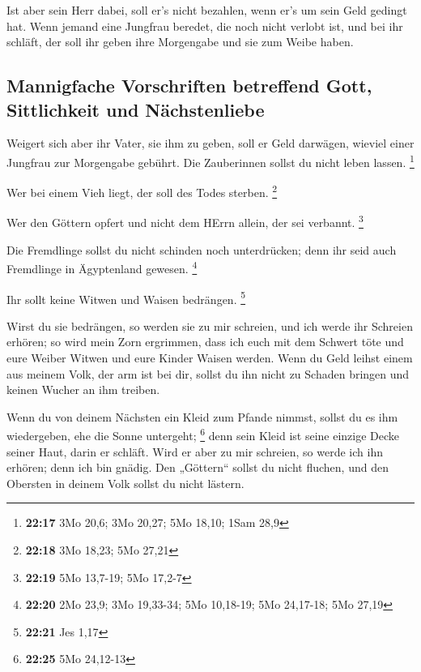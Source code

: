  Ist aber sein Herr dabei, soll er's nicht bezahlen, wenn
er's um sein Geld gedingt hat.  Wenn jemand eine Jungfrau
beredet, die noch nicht verlobt ist, und bei ihr schläft, der soll ihr
geben ihre Morgengabe und sie zum Weibe haben.

\hypertarget{mannigfache-vorschriften-betreffend-gott-sittlichkeit-und-nuxe4chstenliebe}{%
\subsection{Mannigfache Vorschriften betreffend Gott, Sittlichkeit und
Nächstenliebe}\label{mannigfache-vorschriften-betreffend-gott-sittlichkeit-und-nuxe4chstenliebe}}

 Weigert sich aber ihr Vater, sie ihm zu geben, soll er
Geld darwägen, wieviel einer Jungfrau zur Morgengabe gebührt.
 Die Zauberinnen sollst du nicht leben lassen.
\footnote{\textbf{22:17} 3Mo 20,6; 3Mo 20,27; 5Mo 18,10; 1Sam 28,9}

 Wer bei einem Vieh liegt, der soll des Todes sterben.
\footnote{\textbf{22:18} 3Mo 18,23; 5Mo 27,21}

 Wer den Göttern opfert und nicht dem HErrn allein, der
sei verbannt. \footnote{\textbf{22:19} 5Mo 13,7-19; 5Mo 17,2-7}

 Die Fremdlinge sollst du nicht schinden noch
unterdrücken; denn ihr seid auch Fremdlinge in Ägyptenland gewesen.
\footnote{\textbf{22:20} 2Mo 23,9; 3Mo 19,33-34; 5Mo 10,18-19; 5Mo
  24,17-18; 5Mo 27,19}

 Ihr sollt keine Witwen und Waisen bedrängen. \footnote{\textbf{22:21}
  Jes 1,17}

 Wirst du sie bedrängen, so werden sie zu mir schreien,
und ich werde ihr Schreien erhören;  so wird mein Zorn
ergrimmen, dass ich euch mit dem Schwert töte und eure Weiber Witwen und
eure Kinder Waisen werden.  Wenn du Geld leihst einem aus
meinem Volk, der arm ist bei dir, sollst du ihn nicht zu Schaden bringen
und keinen Wucher an ihm treiben.

 Wenn du von deinem Nächsten ein Kleid zum Pfande nimmst,
sollst du es ihm wiedergeben, ehe die Sonne untergeht; \footnote{\textbf{22:25}
  5Mo 24,12-13}  denn sein Kleid ist seine einzige Decke
seiner Haut, darin er schläft. Wird er aber zu mir schreien, so werde
ich ihn erhören; denn ich bin gnädig.  Den „Göttern``
sollst du nicht fluchen, und den Obersten in deinem Volk sollst du nicht
lästern.

